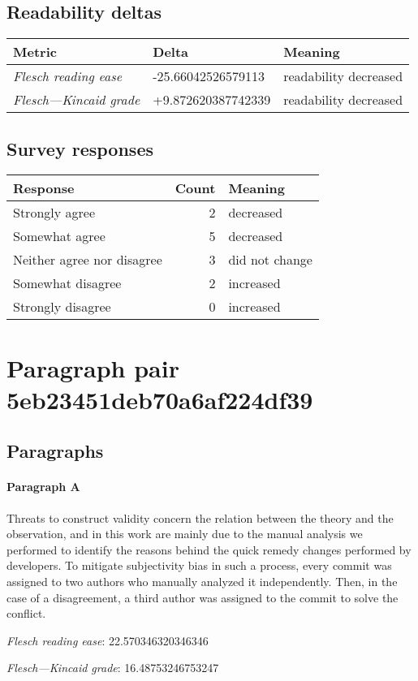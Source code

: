 \subsection{Readability deltas}

\begin{tabular}{lll}
\toprule
               \textbf{Metric} &      \textbf{Delta} &       \textbf{Meaning} \\
\midrule
    \emph{Flesch reading ease} &  -25.66042526579113 &  readability decreased \\
 \emph{Flesch---Kincaid grade} &  +9.872620387742339 &  readability decreased \\
\bottomrule
\end{tabular}

\subsection{Survey responses}
\begin{tabular}{lrl}
\toprule
          \textbf{Response} &  \textbf{Count} & \textbf{Meaning} \\
\midrule
             Strongly agree &               2 &        decreased \\
             Somewhat agree &               5 &        decreased \\
 Neither agree nor disagree &               3 &   did not change \\
          Somewhat disagree &               2 &        increased \\
          Strongly disagree &               0 &        increased \\
\bottomrule
\end{tabular}

\section{Paragraph pair 5eb23451deb70a6af224df39}
\subsection{Paragraphs}
\paragraph{Paragraph A}
Threats to construct validity concern the relation between the theory and the observation, and in this work are mainly due to the manual analysis we performed to identify the reasons behind the quick remedy changes performed by developers. To mitigate subjectivity bias in such a process, every commit was assigned to two authors who manually analyzed it independently. Then, in the case of a disagreement, a third author was assigned to the commit to solve the conflict.\par\medskip\emph{Flesch reading ease}: 22.570346320346346\par\emph{Flesch---Kincaid grade}: 16.48753246753247

